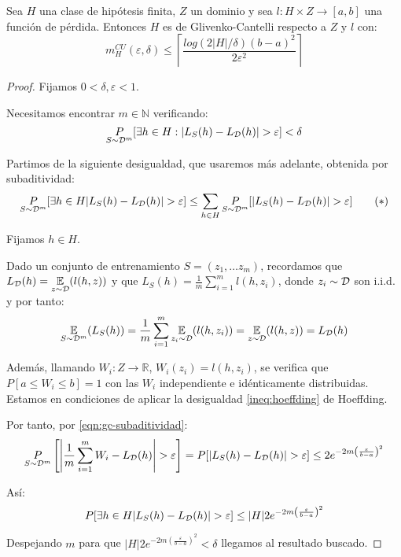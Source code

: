   
\begin{fact}
Sea $H$ una clase de hipótesis finita, $Z$ un dominio y sea $l : H \times Z \rightarrow [a,b]$ una función de pérdida.
Entonces $H$ es de Glivenko-Cantelli respecto a $Z$ y $l$ con:
\[
  m_{H}^{CU}(\varepsilon, \delta) \le \left\lceil \frac{log(2|H|/\delta)(b-a)^2}{2\varepsilon^2} \right\rceil
\]
\label{fact:finitas-gc}
\end{fact}
  \begin{proof}
  Fijamos $0 < \delta, \varepsilon < 1$. 
  
  Necesitamos encontrar $m\in \mathbb{N}$ verificando:
  \[
    \underset{S\sim \mathcal{D}^m}{P} [\exists h\in H : |L_S(h) - L_{\mathcal{D}}(h)| > \varepsilon] < \delta
  \]

  Partimos de la siguiente desigualdad, que usaremos más adelante, obtenida por subaditividad:
  \begin{equation}
  \underset{S\sim \mathcal{D}^m}{P} [\exists h\in H |L_S(h) - L_{\mathcal{D}}(h)| > \varepsilon] \le 
  \sum_{h \in H} \underset{S\sim \mathcal{D}^m}{P} [|L_S(h) - L_{\mathcal{D}}(h)| > \varepsilon]
  \label{eqn:gc-subaditividad}\tag{$\ast$}
  \end{equation}

  Fijamos $h \in H$.

  Dado un conjunto de entrenamiento $S = (z_1, \ldots z_m)$, recordamos que 
  $L_{\mathcal{D}} (h) = \underset{z\sim \mathcal{D}}{\mathbb{E}} (l(h,z))$ y que $L_{S}(h) = \frac{1}{m} \sum_{i=1}^m l(h,z_i)$, donde $z_i \sim \mathcal{D}$ son i.i.d.
  y por tanto:
  \[
    \underset{S\sim \mathcal{D}^m}{\mathbb{E}} (L_S(h)) = \frac{1}{m} \sum_{i=1}^m \underset{z_i\sim \mathcal{D}} {\mathbb{E}}(l(h,z_i)) =  \underset{z\sim \mathcal{D}}{\mathbb{E}} (l(h,z)) = L_{\mathcal{D}} (h)
  \] 
  
  Además, llamando $W_i:Z \rightarrow \mathbb{R}$, $W_i (z_i) = l(h,z_i)$, se verifica que $P[a \le W_i \le b] = 1$
  con las $W_i$ independiente e idénticamente distribuidas. Estamos en condiciones de aplicar la desigualdad \ref{ineq:hoeffding} de Hoeffding.

  Por tanto, por \eqref{eqn:gc-subaditividad}:
  \[
    \underset{S\sim \mathcal{D}^m}{P} \left[\left| \frac{1}{m} \sum_{i=1}^m W_i - L_{\mathcal{D}} (h) \right| > \varepsilon\right] = 
    P [|L_S(h) - L_{\mathcal{D}}(h)| > \varepsilon] \le 2e^{-2m \left( \frac{\varepsilon}{b-a} \right)^2}
  \]

  Así:
  \[
    P [\exists h\in H |L_S(h) - L_{\mathcal{D}}(h)| > \varepsilon] \le 
    |H| 2e^{-2m \left( \frac{\varepsilon}{b-a} \right)^2}
  \]

  Despejando $m$ para que $|H| 2e^{-2m \left( \frac{\varepsilon}{b-a} \right)^2} < \delta$ 
  llegamos al resultado buscado.
  \end{proof}


